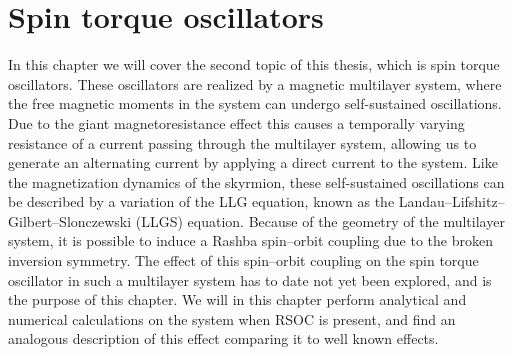 \chapter{Spin torque oscillators} \label{chap:STO}
In this chapter we will cover the second topic of this thesis, which is spin torque oscillators. These oscillators are realized by a magnetic multilayer system, where the free magnetic moments in the system can undergo self-sustained oscillations. Due to the giant magnetoresistance effect this causes a temporally varying resistance of a current passing through the multilayer system, allowing us to generate an alternating current by applying a direct current to the system. Like the magnetization dynamics of the skyrmion, these self-sustained oscillations can be described by a variation of the LLG equation, known as the Landau--Lifshitz--Gilbert--Slonczewski (LLGS) equation. Because of the geometry of the multilayer system, it is possible to induce a Rashba spin--orbit coupling due to the broken inversion symmetry. The effect of this spin--orbit coupling on the spin torque oscillator in such a multilayer system has to date not yet been explored, and is the purpose of this chapter. We will in this chapter perform analytical and numerical calculations on the system when RSOC is present, and find an analogous description of this effect comparing it to well known effects.

